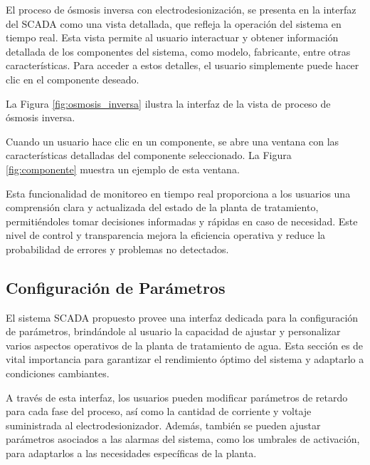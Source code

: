 El proceso de ósmosis inversa con electrodesionización, se presenta en la interfaz del SCADA como una vista detallada, que refleja la operación del sistema en tiempo real. Esta vista permite al usuario interactuar y obtener información detallada de los componentes del sistema, como modelo, fabricante, entre otras características. Para acceder a estos detalles, el usuario simplemente puede hacer clic en el componente deseado.

La Figura \ref{fig:osmosis_inversa} ilustra la interfaz de la vista de proceso de ósmosis inversa.

\begin{figure}[h!]
    \centering
\end{figure}

Cuando un usuario hace clic en un componente, se abre una ventana con las características detalladas del componente seleccionado. La Figura \ref{fig:componente} muestra un ejemplo de esta ventana.

\begin{figure}[h!]
    \centering
\end{figure}

Esta funcionalidad de monitoreo en tiempo real proporciona a los usuarios una comprensión clara y actualizada del estado de la planta de tratamiento, permitiéndoles tomar decisiones informadas y rápidas en caso de necesidad. Este nivel de control y transparencia mejora la eficiencia operativa y reduce la probabilidad de errores y problemas no detectados.

\subsection{Configuración de Parámetros}

El sistema SCADA propuesto provee una interfaz dedicada para la configuración de parámetros, brindándole al usuario la capacidad de ajustar y personalizar varios aspectos operativos de la planta de tratamiento de agua. Esta sección es de vital importancia para garantizar el rendimiento óptimo del sistema y adaptarlo a condiciones cambiantes.

A través de esta interfaz, los usuarios pueden modificar parámetros de retardo para cada fase del proceso, así como la cantidad de corriente y voltaje suministrada al electrodesionizador. Además, también se pueden ajustar parámetros asociados a las alarmas del sistema, como los umbrales de activación, para adaptarlos a las necesidades específicas de la planta.

